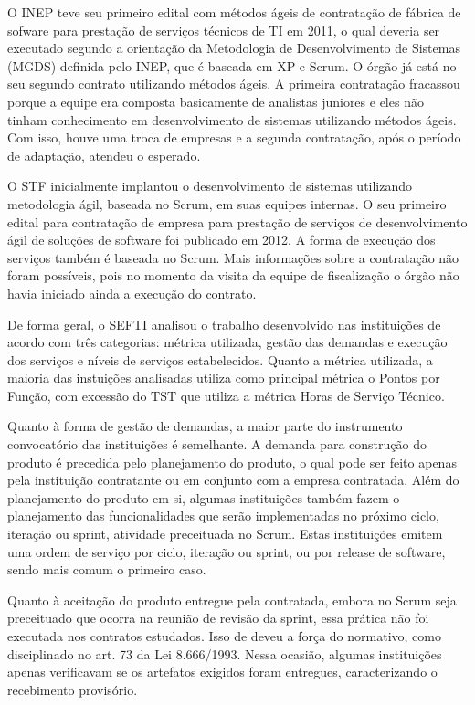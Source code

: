 O INEP teve seu primeiro edital com métodos ágeis de contratação de fábrica de sofware para prestação de serviços técnicos de TI em 2011, o qual deveria ser executado segundo a orientação da Metodologia de Desenvolvimento de Sistemas (MGDS) definida pelo INEP, que é baseada em XP e Scrum. O órgão já está no seu segundo contrato utilizando métodos ágeis. A primeira contratação fracassou porque a equipe era composta basicamente de analistas juniores e eles não tinham conhecimento em desenvolvimento de sistemas utilizando métodos ágeis. Com isso, houve uma troca de empresas e a segunda contratação, após o período de adaptação, atendeu o esperado.

O STF inicialmente implantou o desenvolvimento de sistemas utilizando metodologia ágil, baseada no Scrum, em suas equipes internas. O seu primeiro edital para contratação de empresa para prestação de serviços de desenvolvimento ágil de soluções de software foi publicado em 2012. A forma de execução dos serviços também é baseada no Scrum. Mais informações sobre a contratação não foram possíveis, pois no momento da visita da equipe de fiscalização o órgão não havia iniciado ainda a execução do contrato. 

De forma geral, o SEFTI analisou o trabalho desenvolvido nas instituições de acordo com três categorias: métrica utilizada, gestão das demandas e execução dos serviços e níveis de serviços estabelecidos. Quanto a métrica utilizada, a maioria das instuições analisadas utiliza como principal métrica o Pontos por Função, com excessão do TST que utiliza a métrica Horas de Serviço Técnico. 

Quanto à forma de gestão de demandas, a maior parte do instrumento convocatório das instituições é semelhante. A demanda para construção do produto é precedida pelo planejamento do produto, o qual pode ser feito apenas pela instituição contratante ou em conjunto com a empresa contratada. Além do planejamento do produto em si, algumas instituições também fazem o planejamento das funcionalidades que serão implementadas no próximo ciclo, iteração ou sprint, atividade preceituada no Scrum. Estas instituições emitem uma ordem de serviço por ciclo, iteração ou sprint, ou por release de software, sendo mais comum o primeiro caso. 

Quanto à aceitação do produto entregue pela contratada, embora no Scrum seja preceituado que ocorra na reunião de revisão da sprint, essa prática não foi executada nos contratos estudados. Isso de deveu a força do normativo, como disciplinado no art. 73 da Lei 8.666/1993. Nessa ocasião, algumas instituições apenas verificavam se os artefatos exigidos foram entregues, caracterizando o recebimento provisório. 

